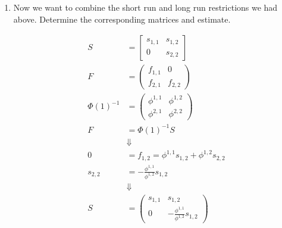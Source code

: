 \begin{enumerate}
    \item Now we want to combine the short run and long run restrictions we had above. Determine the corresponding matrices and estimate.

          \begin{sol}
              \begin{align*}
                  S
                   & = \begin{bmatrix}
                           s_{1, 1} & s_{1, 2} \\
                           0        & s_{2, 2}
                       \end{bmatrix}
                  \\[0.2cm]
                  F
                   & =  \begin{pmatrix}
                            f_{1, 1} & 0        \\
                            f_{2, 1} & f_{2, 2}
                        \end{pmatrix}
                  \\[0.2cm]
                  \Phi(1)^{-1}
                   & = \begin{pmatrix}
                           \phi^{1, 1} & \phi^{1, 2} \\
                           \phi^{2, 1} & \phi^{2, 2}
                       \end{pmatrix}
                  \\[0.2cm]
                  F
                   & = \Phi(1)^{-1} S
                  \\[0.2cm]
                   & \Downarrow
                  \\[0.2cm]
                  0
                   & = f_{1, 2} = \phi^{1, 1} s_{1, 2} + \phi^{1, 2} s_{2, 2}
                  \\[0.2cm]
                  s_{2, 2}
                   & = -\frac{\phi^{1, 1}}{\phi^{1, 2}} s_{1, 2}
                  \\[0.2cm]
                   & \Downarrow
                  \\[0.2cm]
                  S
                   & = \begin{pmatrix}
                           s_{1, 1} & s_{1, 2}
                           \\
                           0        & -\frac{\phi^{1, 1}}{\phi^{1, 2}} s_{1, 2}
                       \end{pmatrix}
              \end{align*}


\end{sol}
\end{enumerate}
